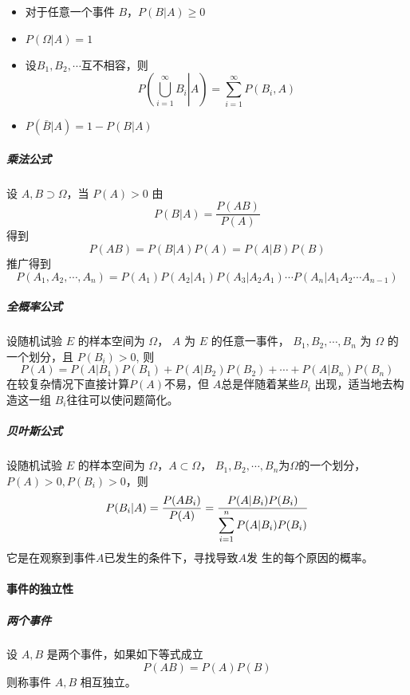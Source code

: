 \begin{itemize}
    \item 对于任意一个事件 $B$，$P(B|A) \geqslant 0$
    \item $P(\Omega | A)=1$
    \item 设$B_1,B_2,\cdots$互不相容，则 \begin{equation}
        P\left(\left. \bigcup_{i=1}^\infty B_i \right| A \right) = \sum_{i=1}^\infty P(B_i,A)
    \end{equation}
    \item $P(\bar{B} |A) = 1 - P(B|A)$
\end{itemize}

\subparagraph{乘法公式} 设 $A,B \supset \Omega$，当 $P(A) > 0$ 由
\begin{equation*}
    P(B|A) = \frac{P(AB)}{P(A)}
\end{equation*} 得到 \begin{equation}
    P(AB) = P(B|A)P(A) = P(A|B)P(B)
\end{equation} 推广得到
\begin{equation}
    P(A_1,A_2, \cdots ,A_n) = P(A_1)P(A_2|A_1)P(A_3|A_2A_1) \cdots
    P(A_{n}|A_1A_2\cdots A_{n-1})
\end{equation}

\subparagraph{全概率公式} 设随机试验 $E$ 的样本空间为 $\Omega$， $A$ 为 $E$ 的任意一事件，
$B_1,B_2,\cdots,B_n$ 为 $\Omega$ 的一个划分，且 $P(B_i) > 0$, 则
\begin{equation}
    P(A) = P(A|B_1)P(B_1) + P(A|B_2)P(B_2) + \cdots + P(A|B_n)P(B_n)
\end{equation}
在较复杂情况下直接计算$P(A)$不易，但 $A$总是伴随着某些$B_i$ 出现，适当地去构造这一组 $B_i$往往可以使问题简化。

\subparagraph{贝叶斯公式} 设随机试验 $E$ 的样本空间为 $\Omega$，$A \subset \Omega$，
$B_1,B_2,\cdots,B_n$为$\Omega$的一个划分，$P(A) > 0,P(B_i)>0$，则
\begin{equation}
    P(B_i|A) = \frac{P(AB_i)}{P(A)} = \displaystyle{\frac{\displaystyle{
        P(A|B_i)P(B_i)
    }}{\displaystyle{
        \sum_{i=1}^n P(A|B_i)P(B_i)
    }}}
\end{equation}
它是在观察到事件$A$已发生的条件下，寻找导致$A$发 生的每个原因的概率。

\paragraph{事件的独立性}
\subparagraph{两个事件}设 $A,B$ 是两个事件，如果如下等式成立 
\begin{equation}
    P(AB) = P(A)P(B)
\end{equation}
则称事件 $A,B$ 相互独立。


